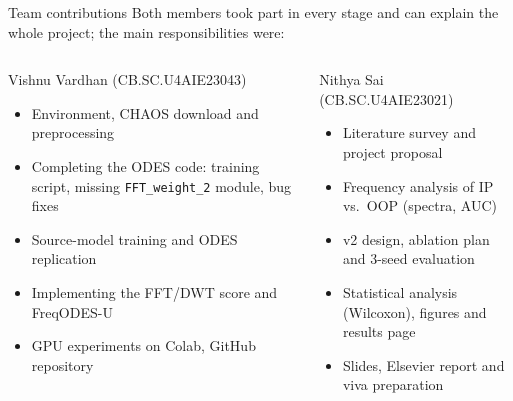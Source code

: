 \documentclass[aspectratio=169,10pt]{beamer}
\newcommand{\MemberA}{Vishnu Vardhan (CB.SC.U4AIE23043)}
\newcommand{\MemberB}{Nithya Sai (CB.SC.U4AIE23021)}
\begin{document}
\begin{frame}{Team contributions}
  \small Both members took part in every stage and can explain the whole project; the main responsibilities were:\\[3mm]
  \begin{columns}[T]
    \begin{block}{\MemberA}
      \small
      \begin{itemize}
        \item Environment, CHAOS download and preprocessing
        \item Completing the ODES code: training script, missing \texttt{FFT\_weight\_2} module, bug fixes
        \item Source-model training and ODES replication
        \item Implementing the FFT/DWT score and FreqODES-U
        \item GPU experiments on Colab, GitHub repository
      \end{itemize}
    \end{block}
    \begin{block}{\MemberB}
      \small
      \begin{itemize}
        \item Literature survey and project proposal
        \item Frequency analysis of IP vs.\ OOP (spectra, AUC)
        \item v2 design, ablation plan and 3-seed evaluation
        \item Statistical analysis (Wilcoxon), figures and results page
        \item Slides, Elsevier report and viva preparation
      \end{itemize}
    \end{block}
  \end{columns}
\end{frame}
\end{document}
